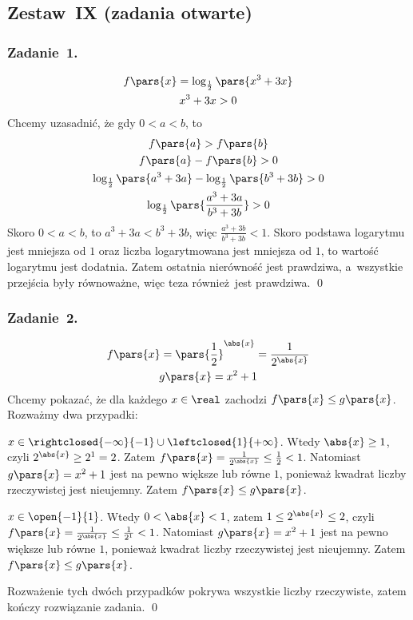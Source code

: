 \subsection*{Zestaw~IX (zadania otwarte)}
\subsubsection*{Zadanie~1.}
\begin{gather*}
    f\pars{x} = \log_{\frac{1}{2}}\pars{x^3 + 3x}\\
    x^3 + 3x > 0
\end{gather*}
Chcemy uzasadnić, że gdy \(0 < a < b\), to
\begin{gather*}
    f\pars{a} > f\pars{b}\\
    f\pars{a} - f\pars{b} > 0\\
    \log_{\frac{1}{2}}\pars{a^3 + 3a} - \log_{\frac{1}{2}}\pars{b^3 + 3b} > 0\\
    \log_{\frac{1}{2}}\pars{\frac{a^3 + 3a}{b^3 + 3b}} > 0
\end{gather*}
Skoro \(0 < a < b\), to \(a^3 + 3a < b^3 + 3b\), więc \(\frac{a^3 + 3b}{b^3 + 3b} < 1\). Skoro podstawa logarytmu jest mniejsza od \(1\) oraz liczba logarytmowana jest mniejsza od \(1\), to wartość logarytmu jest dodatnia. Zatem ostatnia nierówność jest prawdziwa, a~wszystkie przejścia były równoważne, więc teza również jest prawdziwa.
\qed
\subsubsection*{Zadanie~2.}
\begin{gather*}
    f\pars{x} = \pars{\frac{1}{2}}^{\abs{x}} = \frac{1}{2^{\abs{x}}}\\
    g\pars{x} = x^2 + 1
\end{gather*}
Chcemy pokazać, że dla każdego \(x \in \real\) zachodzi \(f\pars{x} \leq g\pars{x}\). Rozważmy dwa przypadki:
\begin{proofcases}
    \item \(x \in \rightclosed{-\infty}{-1} \cup \leftclosed{1}{+\infty}\). Wtedy \(\abs{x} \geq 1\), czyli \(2^{\abs{x}} \geq 2^1 = 2\). Zatem \(f\pars{x} = \frac{1}{2^{\abs{x}}} \leq \frac{1}{2} < 1\). Natomiast \(g\pars{x} = x^2 + 1\) jest na pewno większe lub równe \(1\), ponieważ kwadrat liczby rzeczywistej jest nieujemny. Zatem \(f\pars{x} \leq g\pars{x}\).
    \item \(x \in \open{-1}{1}\). Wtedy \(0 < \abs{x} < 1\), zatem \(1 \leq 2^{\abs{x}} \leq 2\), czyli \(f\pars{x} = \frac{1}{2^{\abs{x}}} \leq \frac{1}{2^1} < 1\). Natomiast \(g\pars{x} = x^2 + 1\) jest na pewno większe lub równe \(1\), ponieważ kwadrat liczby rzeczywistej jest nieujemny. Zatem \(f\pars{x} \leq g\pars{x}\).
\end{proofcases}
Rozważenie tych dwóch przypadków pokrywa wszystkie liczby rzeczywiste, zatem kończy rozwiązanie zadania.
\qed
